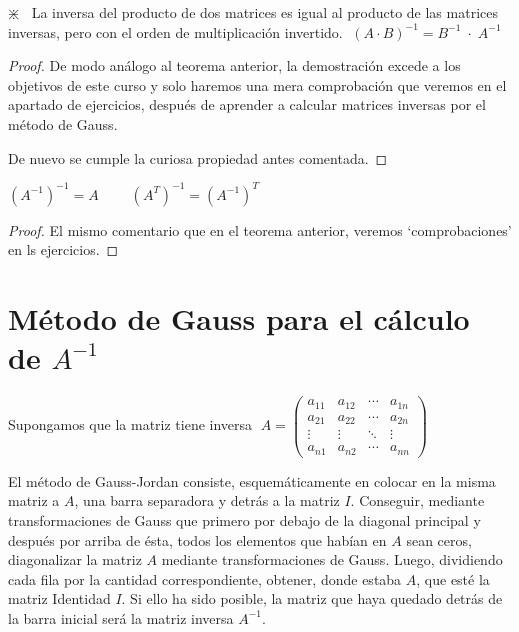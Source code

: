 \begin{teor}
\label{prod-inv}
$\divideontimes \; \;$ La inversa del producto de dos matrices es igual al producto de las matrices inversas, pero con el orden de multiplicación invertido. $ \; (A\cdot B)^{-1}=B^{-1} \; \cdot \; A^{-1}$ 	


	
\end{teor}
\begin{proof}

De modo análogo al teorema anterior, la demostración excede a los objetivos de este curso y solo haremos una mera comprobación que veremos en el apartado de ejercicios, después de aprender a calcular matrices inversas por el método de Gauss.

De nuevo se cumple la curiosa propiedad antes comentada.


\end{proof}

\begin{teor}
	$(A^{-1})^{-1}=A\; \qquad (A^T)^{-1}=(A^{-1})^T$
\end{teor}
\begin{proof}
El mismo comentario que en el teorema anterior, veremos `comprobaciones' en ls ejercicios.	
\end{proof}




\section{Método de Gauss para el cálculo de $A^{-1}$}


Supongamos que la matriz tiene inversa $\; A= \left( \begin{matrix}  a_{11}&a_{12}&\cdots &a_{1n}\\ a_{21}&a_{22}&\cdots &a_{2n}\\ \vdots&\vdots&\ddots&\vdots\\a_{n1}&a_{n2}&\cdots &a_{nn}  \end{matrix} \right)$

El método de Gauss-Jordan consiste, esquemáticamente en colocar en la misma matriz a $A$, una barra separadora y detrás a la matriz $I$. Conseguir, mediante transformaciones de Gauss que primero por debajo de la diagonal principal y después por arriba de ésta, todos los elementos que habían en $A$ sean ceros, diagonalizar la matriz $A$ mediante transformaciones de Gauss. Luego, dividiendo cada fila por la cantidad correspondiente, obtener, donde estaba $A$, que esté la matriz Identidad $I$. Si ello ha sido posible, la matriz que haya quedado detrás de la barra inicial será la matriz inversa $A^{-1}$.

